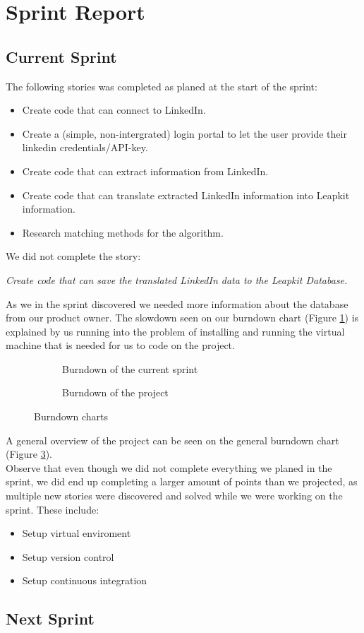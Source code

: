 \newpage
\section{Sprint Report}

\subsection{Current Sprint}

The following stories was completed as planed at the start of the sprint:
\begin{itemize}
    \item Create code that can connect to LinkedIn.
    \item Create a (simple, non-intergrated) login portal to let the user provide their linkedin credentials/API-key. 
    \item Create code that can extract information from LinkedIn.
    \item Create code that can translate extracted LinkedIn information into Leapkit information.
    \item Research matching methods for the algorithm.
\end{itemize}
We did not complete the story:
\begin{center}
    \emph{Create code that can save the translated LinkedIn data to the Leapkit Database.}
\end{center}
As we in the sprint discovered we needed more information about the database from our product owner. The slowdown seen on our burndown chart (Figure \ref{fig:burndownSprint}) is explained by us running into the problem of installing and running the virtual machine that is needed for us to code on the project.\\
\begin{figure}[!ht]
    \centering
    \begin{subfigure}[b]{0.5\textwidth}
        \scalebox{.6}{}
        \caption{Burndown of the current sprint}
        \label{fig:burndownSprint}
    \end{subfigure}%
    \begin{subfigure}[b]{0.5\textwidth}
        \scalebox{.7}{}
        \caption{Burndown of the project}
        \label{fig:burndownProject}
    \end{subfigure}
    \caption{Burndown charts}
\end{figure}
A general overview of the project can be seen on the general burndown chart (Figure \ref{fig:burndownProject}).\\
Observe that even though we did not complete everything we planed in the sprint, we did end up completing a larger amount of points than we projected, as multiple new stories were discovered and solved while we were working on the sprint. These include:
\begin{itemize}
    \item Setup virtual enviroment 
    \item Setup version control
    \item Setup continuous integration
\end{itemize}

\subsection{Next Sprint}

